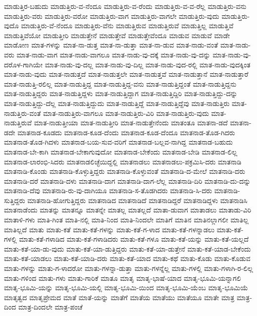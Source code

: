 {ಮಾಡುತ್ತಿರ-ಬಹುದು
ಮಾಡುತ್ತಿರು-ವ-ನೆಂದೂ
ಮಾಡುತ್ತಿರು-ವ-ರೆಂದು
ಮಾಡುತ್ತಿರು-ವ-ವ-ರೆಲ್ಲ
ಮಾಡುತ್ತಿರು-ವನು
ಮಾಡುತ್ತಿರು-ವರು
ಮಾಡುತ್ತಿರು-ವರೋ
ಮಾಡುತ್ತಿರು-ವಾಗ
ಮಾಡುತ್ತಿರು-ವಾಗಲೇ
ಮಾಡುತ್ತಿರು-ವುದು
ಮಾಡುತ್ತಿರು-ವುದೊ
ಮಾಡುತ್ತಿರು-ವೆ-ನೆಂದೂ
ಮಾಡುತ್ತಿರು-ವೆನು
ಮಾಡುತ್ತಿರುವ
ಮಾಡುತ್ತಿರುವೆ
ಮಾಡುತ್ತಿಲ್ಲ
ಮಾಡುತ್ತಿವೆ
ಮಾಡುತ್ತಿವೆಯೋ
ಮಾಡುತ್ತೀರಿ
ಮಾಡುತ್ತೇನೆ
ಮಾಡುತ್ತೇವೆ
ಮಾಡುತ್ತೇವೆಂದೂ
ಮಾಡುವ
ಮಾಡುವೆ
ಮಾಡೇ
ಮಾಡೋಣ
ಮಾತ-ಗಳನ್ನು
ಮಾತ-ನಾ-ಡುತ್ತ
ಮಾತ-ನಾ-ಡುತ್ತಾ
ಮಾತ-ನಾ-ಡುವ
ಮಾತ-ನಾಡು-ವಂತೆ
ಮಾತ-ನಾಡು-ವರು
ಮಾತ-ನಾಡು-ವಾಗ
ಮಾತ-ನಾಡು-ವಾಗಲೂ
ಮಾತ-ನಾಡು-ವು-ದಕ್ಕೆ
ಮಾತ-ನಾಡು-ವು-ದನ್ನು
ಮಾತ-ನಾಡು-ವು-ದರೊಳ-ಗಾಗಿಯೇ
ಮಾತ-ನಾಡು-ವು-ದಲ್ಲ
ಮಾತ-ನಾಡು-ವು-ದಿಲ್ಲ
ಮಾತ-ನಾಡು-ವುದ-ರಲ್ಲಿ
ಮಾತ-ನಾಡು-ವುದಕ್ಕಿಂತ
ಮಾತ-ನಾಡು-ವುದು
ಮಾತ-ನಾಡುತ್ತದೆ
ಮಾತ-ನಾಡುತ್ತಲೇ
ಮಾತ-ನಾಡುತ್ತವೆ
ಮಾತ-ನಾಡುತ್ತಾನೆ
ಮಾತ-ನಾಡುತ್ತಾರೆ
ಮಾತ-ನಾಡುತ್ತಿ-ರಲಿಲ್ಲ
ಮಾತ-ನಾಡುತ್ತಿದ್ದ
ಮಾತ-ನಾಡುತ್ತಿದ್ದ-ವನು
ಮಾತ-ನಾಡುತ್ತಿದ್ದಂತೆ
ಮಾತ-ನಾಡುತ್ತಿದ್ದನು
ಮಾತ-ನಾಡುತ್ತಿದ್ದರು
ಮಾತ-ನಾಡುತ್ತಿದ್ದಳು
ಮಾತ-ನಾಡುತ್ತಿದ್ದಾಗ
ಮಾತ-ನಾಡುತ್ತಿದ್ದಿರಿ
ಮಾತ-ನಾಡುತ್ತಿದ್ದು-ದನ್ನು
ಮಾತ-ನಾಡುತ್ತಿದ್ದು-ದೆಲ್ಲ
ಮಾತ-ನಾಡುತ್ತಿದ್ದುದು
ಮಾತ-ನಾಡುತ್ತಿದ್ದೆ
ಮಾತ-ನಾಡುತ್ತಿದ್ದೆವು
ಮಾತ-ನಾಡುತ್ತಿರು
ಮಾತ-ನಾಡುತ್ತಿರು-ವಂತೆ
ಮಾತ-ನಾಡುತ್ತಿರು-ವಾಗಲೂ
ಮಾತ-ನಾಡುತ್ತಿರು-ವಿರಿ
ಮಾತ-ನಾಡುತ್ತಿರು-ವುದು
ಮಾತ-ನಾಡುತ್ತಿರುವೆ
ಮಾತ-ನಾಡುತ್ತೀಯಾ
ಮಾತ-ನಾಡುತ್ತೀರಿ
ಮಾತ-ನಾಡುತ್ತೇನೆಂದು
ಮಾತಂತೂ
ಮಾತನಾ-ಡದೆ
ಮಾತನಾ-ಡದೇ
ಮಾತನಾಡ-ಕೂಡದು
ಮಾತನಾಡ-ಕೂಡ-ದೆಂದು
ಮಾತನಾಡ-ಕೂಡ-ದೆಂದೂ
ಮಾತನಾಡ-ತೊಡ-ಗಿದರು
ಮಾತನಾಡ-ತೊಡ-ಗಿದಳು
ಮಾತನಾಡ-ಬಯ-ಸುವ-ವರಿಗೆ
ಮಾತನಾಡ-ಬಲ್ಲವ-ನಾಗಿದ್ದ
ಮಾತನಾಡ-ಬಹುದು
ಮಾತನಾಡ-ಬೇ-ಕಾಗಿ
ಮಾತನಾಡ-ಬೇಕಾಗುವುದೋ
ಮಾತನಾಡ-ಬೇಕೆಂದು
ಮಾತನಾಡ-ಬೇಡಿ
ಮಾತನಾಡ-ಲಿಲ್ಲ
ಮಾತನಾಡ-ಲಾರಂಭಿ-ಸಿದರು
ಮಾತನಾಡಲಿಚ್ಛೆಯಿದ್ದಲ್ಲಿ
ಮಾತನಾಡಲು
ಮಾತನಾಡಲು-ಪಕ್ರಮಿಸಿ-ದರು
ಮಾತನಾಡಿ
ಮಾತನಾಡಿ-ಕೊಂಡು
ಮಾತನಾಡಿ-ಕೊಳ್ಳುತ್ತಿದ್ದರು
ಮಾತನಾಡಿ-ಕೊಳ್ಳುವಂತೆ
ಮಾತನಾಡಿ-ದ-ಮೇಲೆ
ಮಾತನಾಡಿ-ದರು
ಮಾತನಾಡಿ-ದರೆ
ಮಾತನಾಡಿ-ದಳು
ಮಾತನಾಡಿ-ದಾಗ
ಮಾತನಾಡಿ-ದಾಗ-ಲೆಲ್ಲ
ಮಾತನಾಡಿ-ದಿರಿ
ಮಾತನಾಡಿ-ದು-ದನ್ನು
ಮಾತನಾಡಿ-ದೆವು
ಮಾತನಾಡಿ-ರು-ವು-ದಾಗಿಯೂ
ಮಾತನಾಡಿ-ಸ-ತೊಡಗಿದರು
ಮಾತನಾಡಿ-ಸಿ-ದರು
ಮಾತನಾಡಿ-ಸುತ್ತಿದ್ದರು
ಮಾತನಾಡಿ-ಹೋಗುತ್ತಿದ್ದರು
ಮಾತನಾಡಿದ
ಮಾತನಾಡಿದೆ
ಮಾತನಾಡಿದ್ದರೆ
ಮಾತನಾಡಿದ್ದಳು
ಮಾತನಾಡಿಸಿ
ಮಾತನಾಡೆಂದು
ಮಾತನ್ನು
ಮಾತನ್ನೂ
ಮಾತನ್ನೇ
ಮಾತಲ್ಲ
ಮಾತಲ್ಲದೆ
ಮಾತಾ-ಡುವಾಗ
ಮಾತಾಡಲು
ಮಾತಾಡು-ವಿರಿ
ಮಾತಾಳಿ-ಗಳು
ಮಾತಿ-ಗಿಂತ
ಮಾತಿ-ನಲ್ಲಿ
ಮಾತಿ-ನಿಂದ
ಮಾತಿ-ನಿಂದಲೇ
ಮಾತಿಗೆ
ಮಾತಿನ
ಮಾತಿನಲ್ಲಾಗಲೀ
ಮಾತಿಲ್ಲ
ಮಾತಿಲ್ಲದೆ
ಮಾತು
ಮಾತು-ಕತೆ
ಮಾತು-ಕತೆ-ಗಳನ್ನು
ಮಾತು-ಕತೆ-ಗ-ಳಾದ
ಮಾತು-ಕತೆ-ಗಳನ್ನಾಡಲು
ಮಾತು-ಕತೆ-ಗಳಲ್ಲಿ
ಮಾತು-ಕತೆ-ಗಳಾಡಿದ
ಮಾತು-ಕತೆ-ಗಳಾಡಿದರು
ಮಾತು-ಕತೆ-ಗಳೂ
ಮಾತು-ಕತೆ-ಯನ್ನು
ಮಾತು-ಕತೆ-ಯಲ್ಲದೆ
ಮಾತು-ಕತೆ-ಯಾ-ಡು-ವುದು
ಮಾತು-ಕತೆ-ಯಾ-ಡುತ್ತಿದ್ದರು
ಮಾತು-ಕತೆ-ಯಾ-ಡುತ್ತೇನೆ
ಮಾತು-ಕತೆ-ಯಾಡ-ಬೇಕೆಂದು
ಮಾತು-ಕತೆ-ಯಾಡಲು
ಮಾತು-ಕತೆ-ಯಾಡಿ-ದರು
ಮಾತು-ಕತೆ-ಯಾದ
ಮಾತು-ಕಥೆ
ಮಾತು-ಕೊಡು
ಮಾತು-ಕೊಡುವ
ಮಾತು-ಗಳನ್ನು
ಮಾತು-ಗ-ಳಾದರೋ
ಮಾತು-ಗಳನ್ನಾ-ಡುತ್ತಾ
ಮಾತು-ಗಳನ್ನೆಲ್ಲ
ಮಾತು-ಗಳಲ್ಲಿ
ಮಾತು-ಗಳಾಗಿ-ರ-ಲಿಲ್ಲ
ಮಾತು-ಗಳಿಂದ
ಮಾತು-ಗಳು
ಮಾತು-ಗಾರಿಕೆ
ಮಾತೂ
ಮಾತೃ
ಮಾತೃ-ಭಾಷೆ-ಯಾದ
ಮಾತೃ-ಭೂಮಿ-ಯನ್ನಾಗಲಿ
ಮಾತೃ-ಭೂಮಿ-ಯನ್ನು
ಮಾತೃ-ಭೂಮಿ-ಯಲ್ಲಿ
ಮಾತೃ-ಭೂಮಿ-ಯಿಂದ
ಮಾತೃ-ಭೂಮಿ-ಯೆಂಬ
ಮಾತೃ-ಭೂಮಿಯೆ
ಮಾತೃತ್ವದ
ಮಾತೃಪ್ರೇಮದ
ಮಾತೆ
ಮಾತೆ-ಯನ್ನು
ಮಾತೆಗೆ
ಮಾತೆಯ
ಮಾತೆಯು
ಮಾತೆಯೂ
ಮಾತೇ
ಮಾತ್ರ
ಮಾತ್ರ-ದಿಂದ
ಮಾತ್ರ-ದಿಂದಲೇ
ಮಾತ್ರ-ಪಂಚೆ
}
